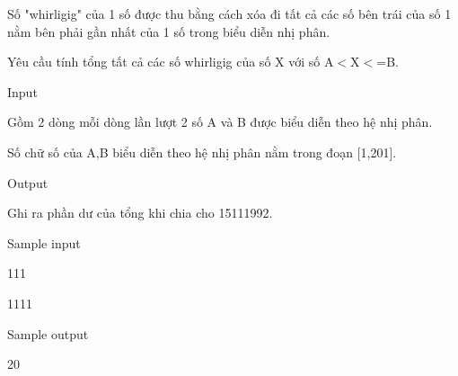 



   Số "whirligig" của 1 số được thu bằng cách xóa đi tất cả các số bên trái của số 1 nằm bên phải gần nhất của 1 số trong biểu diễn nhị phân.  

   Yêu cầu tính tổng tất cả các số whirligig của số X với  số A$<$X$<$=B.  

   Input  

   Gồm 2 dòng mỗi dòng lần lượt 2 số A và B được biểu diễn theo hệ nhị phân.  

   Số chữ số của A,B biểu diễn theo hệ nhị phân nằm trong đoạn [1,201].  

   Output  

   Ghi ra phần dư của tổng khi chia cho 15111992.  

   Sample input  

   111  

   1111  

   Sample output  

   20  




